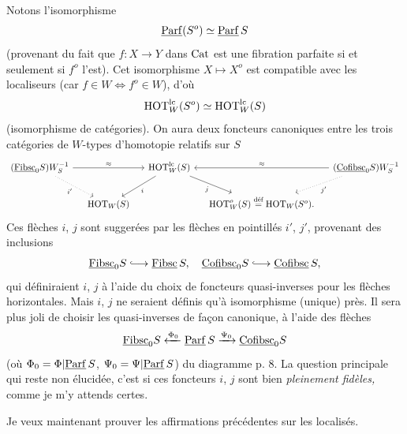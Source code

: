 Notons l'isomorphisme
\[
\underline{\mathrm{Parf}}(S^o) \simeq \underline{\mathrm{Parf}}\,S
\]
(provenant du fait que $f : X \longrightarrow Y$ dans $\mathrm{Cat}$ est une fibration parfaite si et seulement si $f^o$ l'est). Cet isomorphisme $X \longmapsto X^o$ est compatible avec les localiseurs (car $f \in W \Longleftrightarrow f^o \in W$), d'où
\[
\mathrm{HOT}^{\mathrm{lc}}_W(S^o) \simeq \mathrm{HOT}^{\mathrm{lc}}_W(S)
\]
(isomorphisme de catégories). On aura deux foncteurs canoniques entre les trois catégories de $W$-types d'homotopie relatifs sur $S$
\[
\begin{tikzcd}[column sep=small]
(\uc{Fibsc}_0S)W_S^{-1} \arrow[rr, "\approx"] \arrow[dr, dotted, "i'"'] & & \HOT^{\mathrm{lc}}_W(S) \arrow[dl, "i"] \arrow[dr, "j"'] & & (\uc{Cofibsc}_0S)W_S^{-1} \arrow[ll, "\approx"'] \arrow[dl, dotted, "j'"] \\
& \HOT_W(S) & & \HOT^o_W(S) \defeq \HOT_W(S^o). &
\end{tikzcd}
\]
 Ces flèches $i$, $j$ sont suggerées par les flèches en pointillés $i'$, $j'$, provenant des inclusions %
\[
\uc{Fibsc}_0S \lhook\joinrel\longrightarrow \uc{Fibsc}\,S,\quad \uc{Cofibsc}_0S \lhook\joinrel\longrightarrow \uc{Cofibsc}\,S,
\]
qui définiraient $i$, $j$ à l'aide du choix de foncteurs quasi-inverses pour les flèches horizontales. Mais $i$, $j$ ne seraient définis qu'à isomorphisme (unique) près. Il sera plus joli de choisir les quasi-inverses de façon canonique, à l'aide des flèches
\[
\underline{\mathrm{Fibsc}}_0S \xleftarrow{\Phi_0} \underline{\mathrm{Parf}}\,S \xrightarrow{\Psi_0} \underline{\mathrm{Cofibsc}}_0S
\]
(où $\Phi_0 = \Phi|\underline{\mathrm{Parf}}\,S$, $\Psi_0 = \Psi|\underline{\mathrm{Parf}}\,S$) du diagramme p. 8. La question principale
qui reste non élucidée, c'est si ces foncteurs $i$, $j$ sont bien \textit{pleinement fidèles,} comme je m'y attends certes.

Je veux maintenant prouver les affirmations précédentes sur les localisés.

